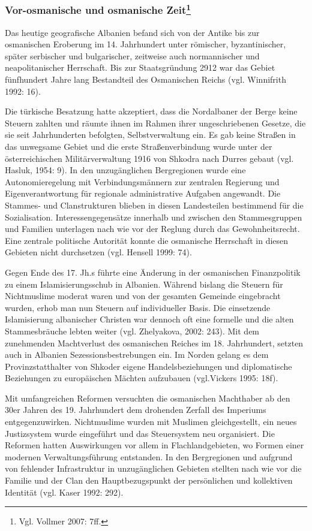 \subsubsection[Vor-osmanische und osmanische Zeit]{Vor-osmanische und osmanische Zeit\footnote{Vgl. Vollmer 2007: 7ff.}}
Das heutige geografische Albanien befand sich von der Antike bis zur osmanischen Eroberung im 14. Jahrhundert unter römischer, byzantinischer, später serbischer und bulgarischer, zeitweise auch normannischer und neapolitanischer Herrschaft. Bis zur Staatsgründung 2912 war das Gebiet fünfhundert Jahre lang Bestandteil des Osmanischen Reichs (vgl. Winnifrith 1992: 16).\par
Die türkische Besatzung hatte akzeptiert, dass die Nordalbaner der Berge keine Steuern zahlten und räumte ihnen im Rahmen ihrer ungeschriebenen Gesetze, die sie seit Jahrhunderten befolgten, Selbstverwaltung ein. Es gab keine Straßen in das unwegsame Gebiet und die erste Straßenverbindung wurde unter der österreichischen Militärverwaltung 1916 von Shkodra nach Durres gebaut (vgl. Hasluk, 1954: 9). In den unzugänglichen Bergregionen wurde eine Autonomieregelung mit Verbindungsmännern zur zentralen Regierung und Eigenverantwortung für regionale administrative Aufgaben angewandt. Die Stammes- und Clanstrukturen blieben in diesen Landesteilen bestimmend für die Sozialisation. Interessengegensätze innerhalb und zwischen den Stammesgruppen und Familien unterlagen nach wie vor der Reglung durch das Gewohnheitsrecht. Eine zentrale politische Autorität konnte die osmanische Herrschaft in diesen Gebieten nicht durchsetzen (vgl. Hensell 1999: 74).\par
Gegen Ende des 17. Jh.s führte eine Änderung in der osmanischen Finanzpolitik zu einem Islamisierungsschub in Albanien. Während bislang die Steuern für Nichtmuslime moderat waren und von der gesamten Gemeinde eingebracht wurden, erhob man nun Steuern auf individueller Basis. Die einsetzende Islamisierung albanischer Christen war dennoch oft eine formelle und die alten Stammesbräuche lebten weiter (vgl. Zhelyakova, 2002: 243). Mit dem zunehmenden Machtverlust des osmanischen Reiches im 18. Jahrhundert, setzten auch in Albanien Sezessionsbestrebungen ein. Im Norden gelang es dem Provinzstatthalter von Shkoder eigene Handelsbeziehungen und diplomatische Beziehungen zu europäischen Mächten aufzubauen (vgl.Vickers 1995: 18f).\par
Mit umfangreichen Reformen versuchten die osmanischen Machthaber ab den 30er Jahren des 19. Jahrhundert dem drohenden Zerfall des Imperiums entgegenzuwirken. Nichtmuslime wurden mit Muslimen gleichgestellt, ein neues Justizsystem wurde eingeführt und das Steuersystem neu organisiert. Die Reformen hatten Auswirkungen vor allem in Flachlandgebieten, wo Formen einer modernen Verwaltungsführung entstanden. In den Bergregionen und aufgrund von fehlender Infrastruktur in unzugänglichen Gebieten stellten nach wie vor die Familie und der Clan den Hauptbezugspunkt der persönlichen und kollektiven Identität (vgl. Kaser 1992: 292).\par
